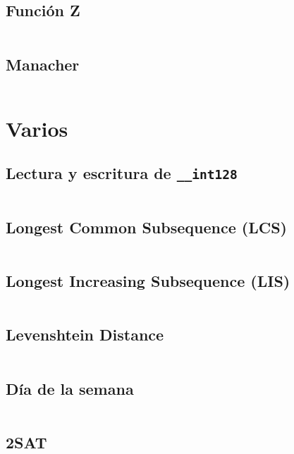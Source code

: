 \documentclass[11pt]{article}
\begin{document}
		\subsection{Función Z}
		\inputminted[tabsize=2,breaklines,firstline=241,lastline=253,fontsize=\small]{c++}{strings.cpp}
		
		\subsection{Manacher}
		\inputminted[tabsize=2,breaklines,firstline=255,lastline=283,fontsize=\small]{c++}{strings.cpp}
	
	\newpage
	\section{Varios}
		\subsection{Lectura y escritura de \texttt{\_\_int128}}
		\inputminted[tabsize=2,breaklines,firstline=46,lastline=83,fontsize=\small]{c++}{misc.cpp}
		
		\subsection{Longest Common Subsequence (LCS)}
		\inputminted[tabsize=2,breaklines,firstline=21,lastline=33,fontsize=\small]{c++}{misc.cpp}
		
		\subsection{Longest Increasing Subsequence (LIS)}
		\inputminted[tabsize=2,breaklines,firstline=5,lastline=19,fontsize=\small]{c++}{misc.cpp}
		
		\subsection{Levenshtein Distance}
		\inputminted[tabsize=2,breaklines,firstline=145,lastline=156,fontsize=\small]{c++}{misc.cpp}
		
		\subsection{Día de la semana}
		\inputminted[tabsize=2,breaklines,firstline=35,lastline=44,fontsize=\small]{c++}{misc.cpp}
		
		\subsection{2SAT}
		\inputminted[tabsize=2,breaklines,firstline=85,lastline=128,fontsize=\small]{c++}{misc.cpp}
		
\end{document}
